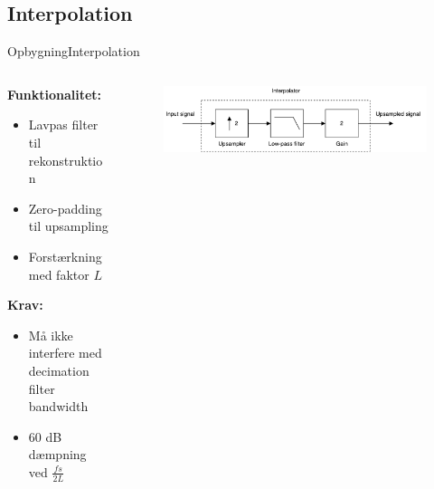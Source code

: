 

\subsection{Interpolation}
\begin{frame}{Opbygning}{Interpolation}

\begin{columns}
  \begin{column}{0.4\textwidth}
  \textbf{Funktionalitet:}
\begin{itemize}
\item Lavpas filter til rekonstruktion
\item Zero-padding til upsampling
\item Forstærkning med faktor $L$
\end{itemize}
\textbf{Krav:}
\begin{itemize}
\item Må ikke interfere med decimation filter bandwidth
\item \alert{60 dB dæmpning ved $\frac{fs}{2L}$}
\end{itemize}
  \end{column}

  \begin{column}{0.6\textwidth}
\begin{figure}
\centering
\includegraphics[width=\textwidth]{designRealInterpolator}
\end{figure}


  \end{column}
\end{columns}

\end{frame}


